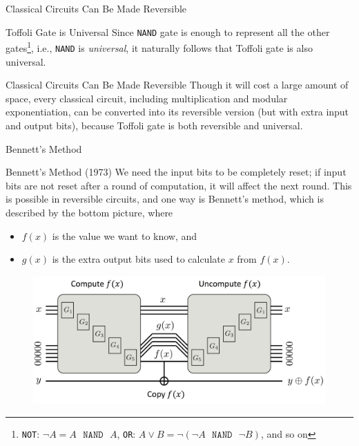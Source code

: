 \documentclass{beamer}
\newcommand{\ttt}[1]{\texttt{#1}}
\newcommand{\mtt}[1]{\mathtt{#1}}
\renewcommand{\:}{\text{ }}
\begin{document}
    \begin{frame}{Classical Circuits Can Be Made Reversible}
        \begin{block}{Toffoli Gate is Universal}
            Since \ttt{NAND} gate is enough to represent all the other gates\footnote{\ttt{NOT}: $\lnot A = A \:\mtt{NAND}\: A$, \ttt{OR}: $A \lor B = \lnot (\lnot A \:\mtt{NAND}\: \lnot B)$, and so on},
            i.e., \ttt{NAND} is \textit{universal},
            it naturally follows that Toffoli gate is also universal.
        \end{block}
        \begin{alertblock}{Classical Circuits Can Be Made Reversible}
            Though it will cost a large amount of space, every classical circuit, including multiplication and modular exponentiation,
            can be converted into its reversible version (but with extra input and output bits), because Toffoli gate is both reversible and universal.
        \end{alertblock}
    \end{frame}

    \begin{frame}{Bennett's Method}
        \begin{block}{Bennett's Method (1973) \href{https://quantum-computing.ibm.com/composer/docs/iqx/guide/shors-algorithm}{}}
            \small
            We need the input bits to be completely reset; if input bits are not reset after a round of computation, it will affect the next round.
            This is possible in reversible circuits, and one way is Bennett's method, which is described by the bottom picture,
            where\\[-0.2em]
            \begin{itemize}
                \setlength\itemsep{-0.2em}
                \item $f(x)$ is the value we want to know, and
                \item $g(x)$ is the extra output bits used to calculate $x$ from $f(x)$.
            \end{itemize} 
        \end{block}
        \begin{figure}
            \centering
            \includegraphics[width=0.7\linewidth]{bennett_method.png}
        \end{figure}
    \end{frame}
\end{document}
